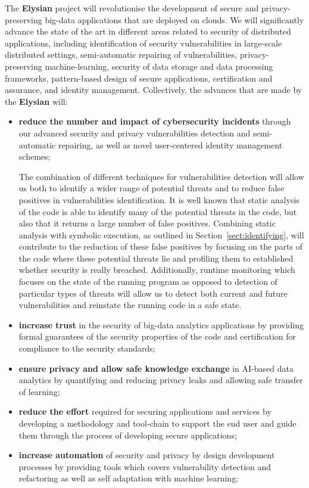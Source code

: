 \documentclass[a4paper,11pt]{article}
\newcommand{\project}[1]{\textbf{#1}\xspace}
\newcommand{\SECURITY}{\project{Elysian}}
\newcommand{\TheProject}{\SECURITY}
\begin{document}
The \TheProject{} project will revolutionise the development of secure and privacy-preserving big-data applications that are deployed on clouds. We will significantly advance the state of the art in different areas related to security of distributed applications, including identification of security vulnerabilities in large-scale distributed settings, semi-automatic repairing of vulnerabilities, privacy-preserving machine-learning, security of data storage and data processing frameworks, pattern-based design of secure applications, certification and assurance, and identity management. Collectively, the advances that are made by the \TheProject{} will:
\begin{itemize}
\item \textbf{reduce the number and impact of cybersecurity incidents} through our advanced security and privacy vulnerabilities detection and semi-automatic repairing, as well as novel user-centered identity management schemes;

\begin{mdframed}[backgroundcolor=blue!5]
The combination of different techniques for vulnerabilities detection will allow us both to identify a wider range of potential threats and to reduce false positives in vulnerabilities identification. It is well known that static analysis of the code is able to identify many of the potential threats in the code, but also that it returns a large number of false positives. Combining static analysis with symbolic execution, as outlined in Section~\ref{sect:identifying}, will contribute to the reduction of these false positives by focusing on the parts of the code where these potential threats lie and profiling them to established whether security is really breached. Additionally, runtime monitoring which focuses on the state of the running program as opposed to detection of particular types of threats will allow us to detect both current and future vulnerabilities and reinstate the running code in a safe state.
\end{mdframed}

\item \textbf{increase trust} in the security of big-data analytics applications by providing formal guarantees of the security properties of the code and certification for compliance to the security standards;
\item \textbf{ensure privacy and allow safe knowledge exchange} in AI-based data analytics by quantifying and reducing privacy leaks and allowing safe transfer of learning;
\item \textbf{reduce the effort} required for securing applications and services by developing a methodology and tool-chain to support the end user and guide them through the process of developing secure applications;
\item \textbf{increase automation}  of security and privacy by design development processes by providing tools which covers vulnerability detection and refactoring as well as self adaptation with machine learning;


\end{itemize}
\end{document}
